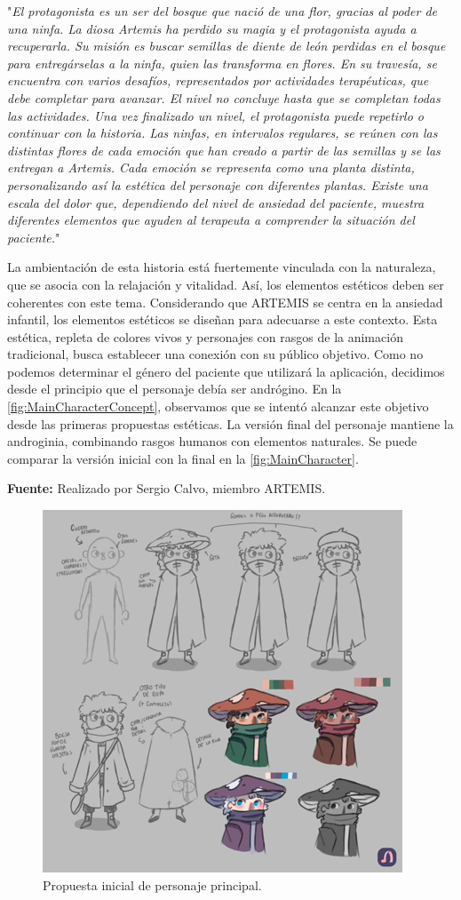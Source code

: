 \begin{adjustwidth}{100pt}{0pt}
	\noindent "\textit{El protagonista es un ser del bosque que nació de una flor, gracias al poder de una ninfa. La diosa Artemis ha perdido su magia y el protagonista ayuda a recuperarla. Su misión es buscar semillas de diente de león perdidas en el bosque para entregárselas a la ninfa, quien las transforma en flores. En su travesía, se encuentra con varios desafíos, representados por actividades terapéuticas, que debe completar para avanzar. El nivel no concluye hasta que se completan todas las actividades. Una vez finalizado un nivel, el protagonista puede repetirlo o continuar con la historia. Las ninfas, en intervalos regulares, se reúnen con las distintas flores de cada emoción que han creado a partir de las semillas y se las entregan a Artemis. Cada emoción se representa como una planta distinta, personalizando así la estética del personaje con diferentes plantas. Existe una escala del dolor que, dependiendo del nivel de ansiedad del paciente, muestra diferentes elementos que ayuden al terapeuta a comprender la situación del paciente.}"
\end{adjustwidth}

La ambientación de esta historia está fuertemente vinculada con la naturaleza, que se asocia con la relajación y vitalidad. Así, los elementos estéticos deben ser coherentes con este tema. Considerando que ARTEMIS se centra en la ansiedad infantil, los elementos estéticos se diseñan para adecuarse a este contexto. Esta estética, repleta de colores vivos y personajes con rasgos de la animación tradicional, busca establecer una conexión con su público objetivo. Como no podemos determinar el género del paciente que utilizará la aplicación, decidimos desde el principio que el personaje debía ser andrógino. En la \autoref{fig:MainCharacterConcept}, observamos que se intentó alcanzar este objetivo desde las primeras propuestas estéticas. La versión final del personaje mantiene la androginia, combinando rasgos humanos con elementos naturales. Se puede comparar la versión inicial con la final en la \autoref{fig:MainCharacter}.

\begin{center}
	\textbf{Fuente:} Realizado por Sergio Calvo, miembro ARTEMIS.
	\vspace{-18pt}
\end{center}

\begin{figure}[h!]
	\centering
	\includegraphics[width=0.4\linewidth]{Figuras/Desarrollo/PersonajesNuevosConcept}
	\caption{Propuesta inicial de personaje principal.}
	\label{fig:MainCharacterConcept}
\end{figure}

